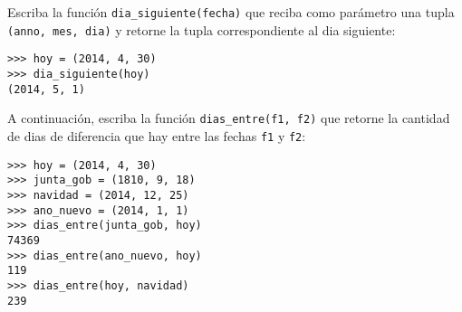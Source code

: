 Escriba la función \verb!dia_siguiente(fecha)!
que reciba como parámetro una tupla \texttt{(anno, mes, dia)}
y retorne la tupla correspondiente al dia siguiente:
\begin{lstlisting}
>>> hoy = (2014, 4, 30)
>>> dia_siguiente(hoy)
(2014, 5, 1)
\end{lstlisting}

A continuación, escriba la función \verb!dias_entre(f1, f2)!
que retorne la cantidad de dias de diferencia
que hay entre las fechas \verb!f1! y \verb!f2!:
\begin{lstlisting}
>>> hoy = (2014, 4, 30)
>>> junta_gob = (1810, 9, 18)
>>> navidad = (2014, 12, 25)
>>> ano_nuevo = (2014, 1, 1)
>>> dias_entre(junta_gob, hoy)
74369
>>> dias_entre(ano_nuevo, hoy)
119
>>> dias_entre(hoy, navidad)
239
\end{lstlisting}
